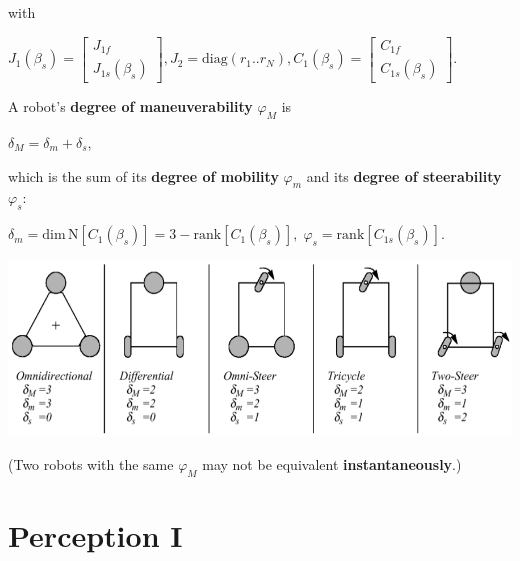 \documentclass[landscape]{article}
\newcommand{\vmspace}{\vspace{-7pt}}
\newcommand{\vpspace}{\vspace{5pt}}
\newcommand{\vtspace}{\vspace{-10pt}}
\begin{document}
\begin{multicols}{3}
\begin{minipage}{\columnwidth}
  with
  \vmspace
  \begin{center}
    $J_1(\beta_s)
    =
    \left[\begin{matrix}
      J_{1f} \\
      J_{1s}(\beta_s)
    \end{matrix}\right],
    J_2
    =
    \mathrm{diag}(r_1..r_N),
    C_1(\beta_s)
    =
    \left[\begin{matrix}
      C_{1f} \\
      C_{1s}(\beta_s)
    \end{matrix}\right].$
  \end{center}
\end{minipage}

\vpspace

\begin{minipage}{\columnwidth}
  A robot's \textbf{degree of maneuverability} $\varphi_M$ is
  \vmspace
  \begin{center}
    $\delta_M = \delta_m + \delta_s$,
  \end{center}
  \vmspace
  which is the sum of its \textbf{degree of mobility} $\varphi_m$ and its
  \textbf{degree of steerability} $\varphi_s$:
  \vmspace
  \begin{center}
    $\delta_m=\mathrm{dim}\,\mathrm{N}\left[C_1(\beta_s)\right] = 3 -
    \mathrm{rank}\left[C_1(\beta_s)\right],\;
    \varphi_s = \mathrm{rank}\left[C_{1s}(\beta_s)\right].$
  \end{center}
\end{minipage}

\includegraphics[width=\columnwidth]{img/3_WheelTypes.png}

\vmspace

(Two robots with the same $\varphi_M$ may not be equivalent
\textbf{instantaneously}.)

\vtspace


\section{Perception I}


\end{multicols}
\end{document}
